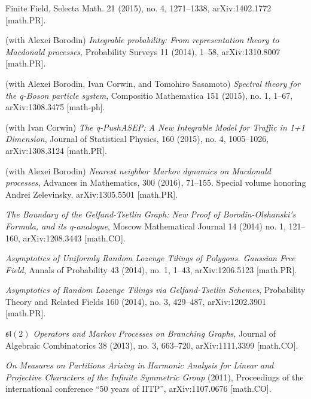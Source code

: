 \documentclass[letterpaper,11pt]{article}
\begin{document}
\begin{etaremune}
{		      Finite
		      Field},
	      Selecta Math. 21 (2015), no. 4,
	      1271--1338,
	      arXiv:1402.1772 [math.PR].
	\item
	      (with Alexei Borodin)
	      \emph{Integrable probability: From representation theory to
		      Macdonald
		      processes},
	      Probability Surveys 11 (2014), 1--58, arXiv:1310.8007 [math.PR].
	\item
	      (with Alexei Borodin, Ivan Corwin, and Tomohiro Sasamoto)
	      \emph{Spectral theory for the q-Boson particle system},
	      Compositio Mathematica 151 (2015), no. 1, 1--67,
	      arXiv:1308.3475 [math-ph].
	\item
	      (with Ivan Corwin)
	      \emph{The q-PushASEP: A New Integrable Model for Traffic in 1+1
		      Dimension},
	      Journal of Statistical Physics,
	      160 (2015), no. 4, 1005--1026,
	      arXiv:1308.3124 [math.PR].
	\item
	      (with Alexei Borodin)
	      \emph{Nearest neighbor Markov dynamics on
		      Macdonald processes},
	      Advances in Mathematics, 300 (2016), 71--155. Special volume
	      honoring
	      Andrei Zelevinsky.
	      arXiv:1305.5501 [math.PR].
	\item
	      \emph{The Boundary of the Gelfand-Tsetlin Graph: New Proof of
		      Borodin-Olshanski's Formula, and its q-analogue},
	      Moscow Mathematical Journal 14 (2014) no. 1, 121--160,
	      arXiv:1208.3443 [math.CO].
	\item
	      \emph{Asymptotics of Uniformly Random Lozenge Tilings of
		      Polygons.
		      Gaussian Free Field},
	      Annals of Probability 43 (2014), no. 1, 1--43,
	      arXiv:1206.5123 [math.PR].
	\item
	      \emph{Asymptotics of Random Lozenge Tilings via Gelfand-Tsetlin
		      Schemes},
	      Probability Theory and Related Fields 160 (2014), no. 3,
	      429--487,
	      arXiv:1202.3901 [math.PR].
	\item
	      \emph{$\mathfrak{sl}(2)$ Operators and Markov Processes on
		      Branching
		      Graphs},
	      Journal of Algebraic Combinatorics 38 (2013), no. 3, 663--720,
	      arXiv:1111.3399 [math.CO].
	\item
	      \emph{On Measures on Partitions Arising in Harmonic Analysis for
		      Linear and Projective Characters of the Infinite
		      Symmetric Group} (2011),
	      Proceedings of the international conference ``50 years of
	      IITP'',
	      arXiv:1107.0676 [math.CO].
	\item

\end{etaremune}
\end{document}
